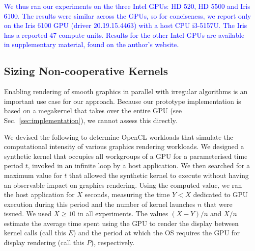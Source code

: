 \documentclass[sigconf]{acmart}
\newcommand{\TSAdded}[1]{\textcolor{blue}{#1}}
\newcommand{\mysec}{Sec.~}
\begin{document}
{%
%
%
\TSAdded{We thus ran our experiments on the three Intel GPUs: HD 520, HD 5500
and Iris 6100. The results were similar across the GPUs, so for
conciseness, we report only on the Iris 6100 GPU (driver
20.19.15.4463) with a host CPU i3-5157U. The Iris has a reported 47
compute units. Results for the other Intel GPUs are available in
supplementary material, found on the author's website.} 


\subsection{Sizing Non-cooperative Kernels}\label{sec:sizingnoncoop}

Enabling rendering of smooth graphics in parallel with irregular
algorithms is an important use case for our approach.  Because our
prototype implementation is based on a megakernel that takes over the
entire GPU (see \mysec\ref{sec:implementation}), we cannot assess this
directly.

We devised the following to determine OpenCL workloads that simulate
the computational intensity of various graphics rendering workloads.
%
We designed a synthetic kernel that occupies all workgroups of a GPU
for a parameterised time period $t$, invoked in an infinite loop by a
host application.  We then searched for a maximum value for $t$ that
allowed the synthetic kernel to execute without having an observable
impact on graphics rendering.  Using the computed value, we ran the
host application for $X$ seconds, measuring the time $Y < X$ dedicated
to GPU execution during this period and the number of kernel launches
$n$ that were issued.  We used $X \geq 10$ in all experiments.  The
values $(X-Y)/n$ and $X/n$ estimate the average time spent using the
GPU to render the display between kernel calls (call this $E$) and the
period at which the OS requires the GPU for display rendering (call
this $P$), respectively.

}
\end{document}
